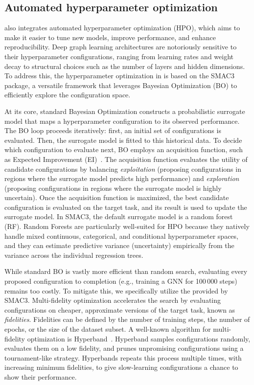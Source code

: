 \subsection{Automated hyperparameter optimization}
\label{sec:ch06:hpo}

\gb{} also integrates automated hyperparameter optimization (HPO), which aims to make it easier to tune new models, improve performance, and enhance reproducibility. Deep graph learning architectures are notoriously sensitive to their hyperparameter configurations, ranging from learning rates and weight decay to structural choices such as the number of layers and hidden dimensions. To address this, the hyperparameter optimization in \gb{} is based on the \textsc{SMAC3}~\citep{LinEtAl22b} package, a versatile framework that leverages Bayesian Optimization (BO) to efficiently explore the configuration space. 

At its core, standard Bayesian Optimization constructs a probabilistic surrogate model that maps a hyperparameter configuration to its observed performance. The BO loop proceeds iteratively: first, an initial set of configurations is evaluated. Then, the surrogate model is fitted to this historical data. To decide which configuration to evaluate next, BO employs an acquisition function, such as Expected Improvement (EI)~\citep{Mockus12}. The acquisition function evaluates the utility of candidate configurations by balancing \emph{exploitation} (proposing configurations in regions where the surrogate model predicts high performance) and \emph{exploration} (proposing configurations in regions where the surrogate model is highly uncertain). Once the acquisition function is maximized, the best candidate configuration is evaluated on the target task, and its result is used to update the surrogate model. 
In \textsc{SMAC3}, the default surrogate model is a random forest (RF). Random Forests are particularly well-suited for HPO because they natively handle mixed continuous, categorical, and conditional hyperparameter spaces, and they can estimate predictive variance (uncertainty) empirically from the variance across the individual regression trees.

While standard BO is vastly more efficient than random search, evaluating every proposed configuration to completion (e.g., training a GNN for 100\,000 steps) remains too costly. To mitigate this, we specifically utilize the  provided by \textsc{SMAC3}. Multi-fidelity optimization accelerates the search by evaluating configurations on cheaper, approximate versions of the target task, known as \emph{fidelities}. Fidelities can be defined by the number of training steps, the number of epochs, or the size of the dataset subset. A well-known algorithm for multi-fidelity optimization is Hyperband~\citep{LiEtAl17b}. Hyperband samples configurations randomly, evaluates them on a low fidelity, and prunes unpromising configurations using a tournament-like strategy. Hyperbands repeats this process multiple times, with increasing minimum fidelities, to give slow-learning configurations a chance to show their performance.

